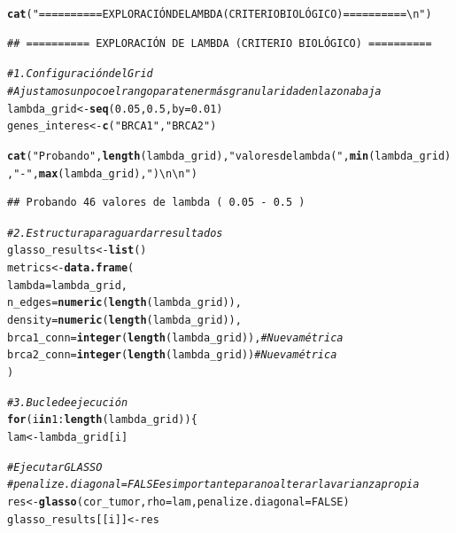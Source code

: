 \documentclass{article}\usepackage[]{graphicx}\usepackage[]{xcolor}
\makeatletter
\newcommand{\hlnum}[1]{\textcolor[rgb]{0.686,0.059,0.569}{#1}}%
\newcommand{\hlsng}[1]{\textcolor[rgb]{0.192,0.494,0.8}{#1}}%
\newcommand{\hlcom}[1]{\textcolor[rgb]{0.678,0.584,0.686}{\textit{#1}}}%
\newcommand{\hlopt}[1]{\textcolor[rgb]{0,0,0}{#1}}%
\newcommand{\hldef}[1]{\textcolor[rgb]{0.345,0.345,0.345}{#1}}%
\newcommand{\hlkwa}[1]{\textcolor[rgb]{0.161,0.373,0.58}{\textbf{#1}}}%
\newcommand{\hlkwb}[1]{\textcolor[rgb]{0.69,0.353,0.396}{#1}}%
\newcommand{\hlkwc}[1]{\textcolor[rgb]{0.333,0.667,0.333}{#1}}%
\newcommand{\hlkwd}[1]{\textcolor[rgb]{0.737,0.353,0.396}{\textbf{#1}}}%
\newenvironment{kframe}{%
 \def\at@end@of@kframe{}%
 \ifinner\ifhmode%
  \def\at@end@of@kframe{\end{minipage}}%
  \begin{minipage}{\columnwidth}%
 \fi\fi%
 \def\FrameCommand##1{\hskip\@totalleftmargin \hskip-\fboxsep
 \colorbox{shadecolor}{##1}\hskip-\fboxsep
     \hskip-\linewidth \hskip-\@totalleftmargin \hskip\columnwidth}%
 \MakeFramed {\advance\hsize-\width
   \@totalleftmargin\z@ \linewidth\hsize
   \@setminipage}}%
 {\par\unskip\endMakeFramed%
 \at@end@of@kframe}
\newenvironment{knitrout}{}{} %
\makeatother
\begin{document}
\begin{knitrout}
\color{fgcolor}\begin{kframe}
\begin{alltt}
\hlkwd{cat}\hldef{(}\hlsng{"========== EXPLORACIÓN DE LAMBDA (CRITERIO BIOLÓGICO) ==========\textbackslash{}n"}\hldef{)}
\end{alltt}
\begin{verbatim}
## ========== EXPLORACIÓN DE LAMBDA (CRITERIO BIOLÓGICO) ==========
\end{verbatim}
\begin{alltt}
\hlcom{# 1. Configuración del Grid}
\hlcom{# Ajustamos un poco el rango para tener más granularidad en la zona baja}
\hldef{lambda_grid} \hlkwb{<-} \hlkwd{seq}\hldef{(}\hlnum{0.05}\hldef{,} \hlnum{0.5}\hldef{,} \hlkwc{by}\hldef{=}\hlnum{0.01}\hldef{)}
\hldef{genes_interes} \hlkwb{<-} \hlkwd{c}\hldef{(}\hlsng{"BRCA1"}\hldef{,} \hlsng{"BRCA2"}\hldef{)}

\hlkwd{cat}\hldef{(}\hlsng{"Probando"}\hldef{,} \hlkwd{length}\hldef{(lambda_grid),} \hlsng{"valores de lambda ("}\hldef{,} \hlkwd{min}\hldef{(lambda_grid),} \hlsng{"-"}\hldef{,} \hlkwd{max}\hldef{(lambda_grid),} \hlsng{")\textbackslash{}n\textbackslash{}n"}\hldef{)}
\end{alltt}
\begin{verbatim}
## Probando 46 valores de lambda ( 0.05 - 0.5 )
\end{verbatim}
\begin{alltt}
\hlcom{# 2. Estructura para guardar resultados}
\hldef{glasso_results} \hlkwb{<-} \hlkwd{list}\hldef{()}
\hldef{metrics} \hlkwb{<-} \hlkwd{data.frame}\hldef{(}
  \hlkwc{lambda} \hldef{= lambda_grid,}
  \hlkwc{n_edges} \hldef{=} \hlkwd{numeric}\hldef{(}\hlkwd{length}\hldef{(lambda_grid)),}
  \hlkwc{density} \hldef{=} \hlkwd{numeric}\hldef{(}\hlkwd{length}\hldef{(lambda_grid)),}
  \hlkwc{brca1_conn} \hldef{=} \hlkwd{integer}\hldef{(}\hlkwd{length}\hldef{(lambda_grid)),} \hlcom{# Nueva métrica}
  \hlkwc{brca2_conn} \hldef{=} \hlkwd{integer}\hldef{(}\hlkwd{length}\hldef{(lambda_grid))}  \hlcom{# Nueva métrica}
\hldef{)}

\hlcom{# 3. Bucle de ejecución}
\hlkwa{for}\hldef{(i} \hlkwa{in} \hlnum{1}\hlopt{:}\hlkwd{length}\hldef{(lambda_grid)) \{}
  \hldef{lam} \hlkwb{<-} \hldef{lambda_grid[i]}

  \hlcom{# Ejecutar GLASSO}
  \hlcom{# penalize.diagonal=FALSE es importante para no alterar la varianza propia}
  \hldef{res} \hlkwb{<-} \hlkwd{glasso}\hldef{(cor_tumor,} \hlkwc{rho}\hldef{=lam,} \hlkwc{penalize.diagonal}\hldef{=}\hlnum{FALSE}\hldef{)}
  \hldef{glasso_results[[i]]} \hlkwb{<-} \hldef{res}


\end{alltt}
\end{kframe}
\end{knitrout}
\end{document}
